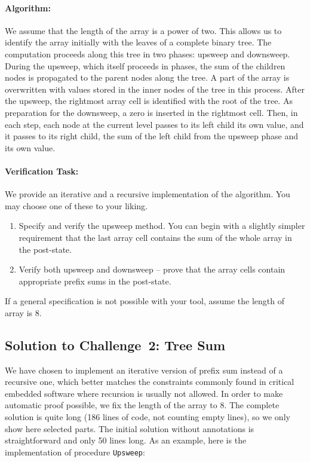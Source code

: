 \documentclass[sttt,final]{svjour}
\begin{document}
\paragraph{Algorithm:}
We assume that the length of the array is a power of two. This allows
us to identify the array initially with the leaves of a complete
binary tree. The computation proceeds along this tree in two phases:
upsweep and downsweep. During the upsweep, which itself proceeds in
phases, the sum of the children nodes is propagated to the parent
nodes along the tree. A part of the array is overwritten with values
stored in the inner nodes of the tree in this process. After the
upsweep, the rightmost array cell is identified with the root of the
tree. As preparation for the downsweep, a zero is inserted in the
rightmost cell.  Then, in each step, each node at the current level
passes to its left child its own value, and it passes to its right
child, the sum of the left child from the upsweep phase and its own
value.
%
\paragraph{Verification Task:}
We provide an iterative and a recursive implementation of the algorithm. You
may choose one of these to your liking.
\begin{enumerate}
\item Specify and verify the upsweep method. You can begin with a
  slightly simpler requirement that the last array cell contains the
  sum of the whole array in the post-state.
\item Verify both upsweep and downsweep -- prove that the array cells
  contain appropriate prefix sums in the post-state.
\end{enumerate}
If a general specification is not possible with your tool, assume the
length of array is 8.

\subsection{Solution to Challenge~2: Tree Sum}
\label{solution2}
We have chosen to implement an iterative version of prefix sum
instead of a recursive one, which better matches the constraints
commonly found in critical embedded software where recursion is
usually not allowed. In order to make automatic proof possible, we fix
the length of the array to 8. The complete solution is quite long (186
lines of code, not counting empty lines), so we only show here
selected parts. The initial solution without annotations is
straightforward and only 50 lines long. As an example, here is the
implementation of procedure \verb|Upsweep|:
\end{document}
